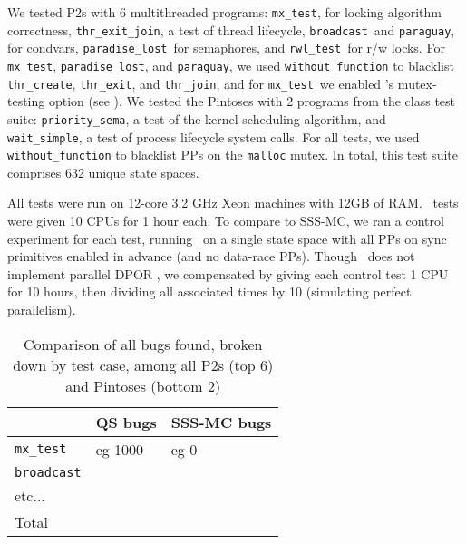 \newcommand\mxtest{\texttt{mx\_test}}
\newcommand\tej{\texttt{thr\_exit\_join}}
\newcommand\bct{\texttt{broadcast}}
\newcommand\paraguay{\texttt{paraguay}}
\newcommand\paradise{\texttt{paradise\_lost}}
\newcommand\rwl{\texttt{rwl\_test}}
We tested P2s with 6 multithreaded programs:
\mxtest, for locking algorithm correctness, \tej, a test of thread lifecycle, \bct~and \paraguay, for condvars, \paradise~for semaphores, and \rwl~for r/w locks.
For \mxtest, \paradise, and \paraguay, we used {\tt without\_function} to blacklist {\tt thr\_create}, {\tt thr\_exit}, and {\tt thr\_join},
and for \mxtest~we enabled \landslide's mutex-testing option
(see \sect{\ref{sec:landslide}}).
\newcommand\prisema{\texttt{priority\_sema}}
\newcommand\waitsimple{\texttt{wait\_simple}}
We tested the Pintoses with 2 programs from the class test suite: \prisema, a test of the kernel scheduling algorithm, and \waitsimple, a test of process lifecycle system calls.
For all tests, we used {\tt without\_function} to blacklist PPs on the {\tt malloc} mutex.
In total, this test suite comprises 632 unique state spaces.

All tests were run on 12-core 3.2 GHz Xeon machines with 12GB of RAM.
\quicksand~tests were given 10 CPUs for 1 hour each.
To compare to SSS-MC, we ran a control experiment for each test, running \landslide~on a single state space with all PPs on sync primitives enabled in advance (and no data-race PPs).
Though \landslide~does not implement parallel DPOR \cite{parallel-dpor}, we compensated by giving each control test 1 CPU for 10 hours, then dividing all associated times by 10 (simulating perfect parallelism).

\begin{table}[t]
	\begin{tabular}{l|l|l}
			& QS bugs & SSS-MC bugs \\
		\hline
		\mxtest & eg 1000 & eg 0 \\
		\bct & & \\
		etc... & & \\
		\hline
		Total & & \\
	\end{tabular}
	\caption{Comparison of all bugs found, broken down by test case, among all P2s (top 6) and Pintoses (bottom 2)}
	\label{tab:allbugs}
\end{table}

